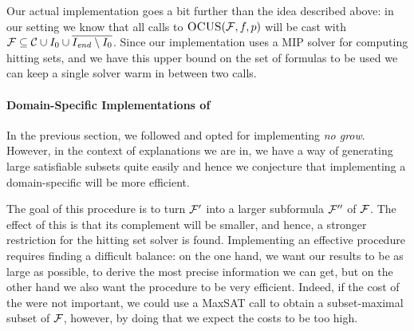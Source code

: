 Our actual implementation goes a bit further than the idea described above: in our setting we know that all calls to $\textsc{OCUS}(\mathcal{F} ,f,p)$ will be cast with $\mathcal{F}  \subseteq \mathcal{C}\cup I_0\cup \overline{I_\mathit{end} \setminus I_0}$. Since our implementation uses a MIP solver for computing hitting sets, and we have this upper bound on the set of formulas to be used we can keep a single solver warm in between two \comus calls. 




\paragraph{Domain-Specific Implementations of \grow} 
In the previous section, we followed \citet{smus} and opted for implementing \emph{no grow}. 
However, in the context of explanations we are in, we have a way of generating large satisfiable subsets quite easily and hence we conjecture that implementing a domain-specific \grow will be more efficient. 

The goal of this \grow procedure is to turn $\mathcal{F} '$ into a larger subformula $\mathcal{F} ''$ of $\mathcal{F} $. The effect of this is that its complement will be smaller, and hence, a stronger restriction for the hitting set solver is found.  
Implementing an effective \grow procedure requires finding a difficult balance: on the one hand, we want our results to be as large as possible, to derive the most precise information we can get, but on the other hand we also want the procedure to be very efficient. 
Indeed, if the cost of the \grow were not important, we could use a MaxSAT call to obtain a subset-maximal subset of $\mathcal{F} $, however, by doing that we expect the \grow costs to be too high. 

